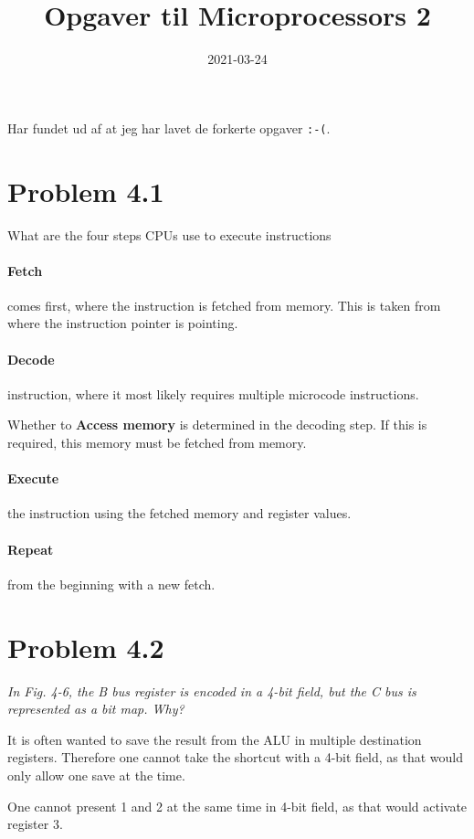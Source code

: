 \title{Opgaver til Microprocessors 2}
\date{2021-03-24}

Har fundet ud af at jeg har lavet de forkerte opgaver \texttt{:-(}.

\section{Problem 4.1}

\begin{opg}
    What are the four steps CPUs use to execute instructions
\end{opg}

\paragraph{Fetch} comes first, where the instruction is fetched from memory.
This is taken from where the instruction pointer is pointing.

\paragraph{Decode} instruction, where it most likely requires multiple microcode instructions.

Whether to \textbf{Access memory} is determined in the decoding step.
If this is required, this memory must be fetched from memory.

\paragraph{Execute} the instruction using the fetched memory and register values.

\paragraph{Repeat} from the beginning with a new fetch.

\section{Problem 4.2}

\emph{In Fig. 4-6, the B bus register is encoded in a 4-bit field, but the C bus is represented
as a bit map. Why?}

It is often wanted to save the result from the ALU in multiple destination registers.
Therefore one cannot take the shortcut with a 4-bit field, as that would only allow one save at the time.

One cannot present 1 and 2 at the same time in 4-bit field, as that would activate register 3.

